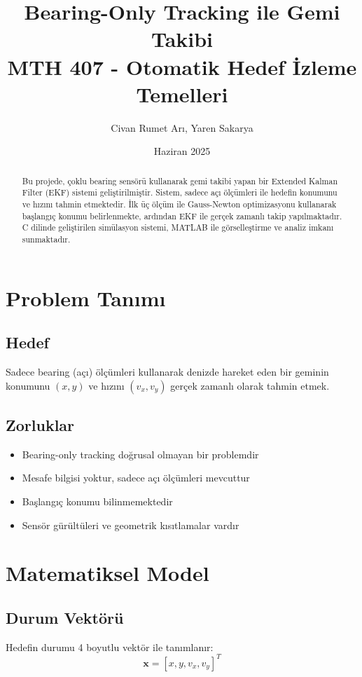 \documentclass[11pt,a4paper]{article}
\title{
    \Large \textbf{Bearing-Only Tracking ile Gemi Takibi} \\
    \normalsize MTH 407 - Otomatik Hedef İzleme Temelleri
}
\author{Civan Rumet Arı, Yaren Sakarya}
\date{Haziran 2025}
\begin{document}
\maketitle

\begin{abstract}
Bu projede, çoklu bearing sensörü kullanarak gemi takibi yapan bir Extended Kalman Filter (EKF) sistemi geliştirilmiştir. Sistem, sadece açı ölçümleri ile hedefin konumunu ve hızını tahmin etmektedir. İlk üç ölçüm ile Gauss-Newton optimizasyonu kullanarak başlangıç konumu belirlenmekte, ardından EKF ile gerçek zamanlı takip yapılmaktadır. C dilinde geliştirilen simülasyon sistemi, MATLAB ile görselleştirme ve analiz imkanı sunmaktadır.
\end{abstract}

\section{Problem Tanımı}

\subsection{Hedef}
Sadece bearing (açı) ölçümleri kullanarak denizde hareket eden bir geminin konumunu $(x, y)$ ve hızını $(v_x, v_y)$ gerçek zamanlı olarak tahmin etmek.

\subsection{Zorluklar}
\begin{itemize}
    \item Bearing-only tracking doğrusal olmayan bir problemdir
    \item Mesafe bilgisi yoktur, sadece açı ölçümleri mevcuttur
    \item Başlangıç konumu bilinmemektedir
    \item Sensör gürültüleri ve geometrik kısıtlamalar vardır
\end{itemize}

\section{Matematiksel Model}

\subsection{Durum Vektörü}
Hedefin durumu 4 boyutlu vektör ile tanımlanır:
\begin{equation}
\mathbf{x} = [x, y, v_x, v_y]^T
\end{equation}
\end{document}
